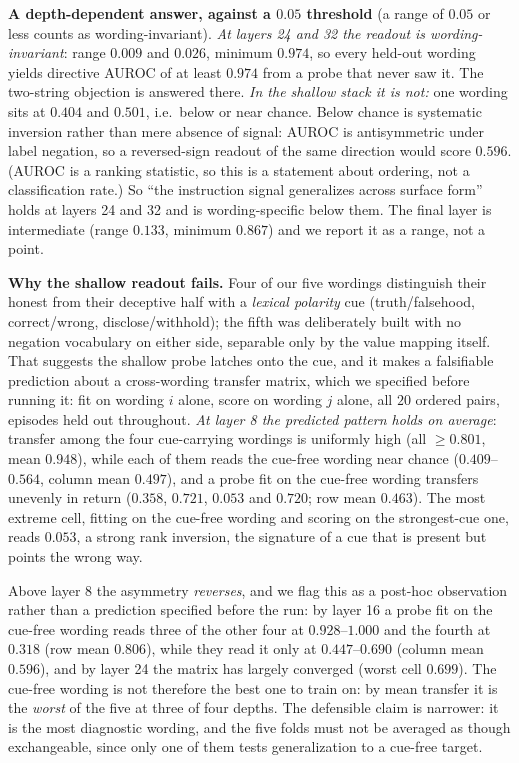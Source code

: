 \documentclass{article}
\begin{document}
\textbf{A depth-dependent answer, against a $0.05$ threshold} (a range of
$0.05$ or less counts as wording-invariant). \emph{At layers 24 and 32 the readout is wording-invariant}: range $0.009$ and $0.026$, minimum $0.974$, so every held-out wording yields directive AUROC of at least $0.974$ from a probe that
never saw it. The two-string objection is answered there. \emph{In the shallow stack it is not:} one wording
sits at $0.404$ and $0.501$, i.e.\ below or near chance. Below chance is systematic inversion rather
than mere absence of signal: AUROC is antisymmetric under label negation, so a reversed-sign readout of the
same direction would score $0.596$. (AUROC is a ranking statistic, so this is a statement about ordering,
not a classification rate.) So ``the instruction signal generalizes across surface form'' holds at layers 24 and 32
and is wording-specific below them. The final layer is intermediate (range $0.133$, minimum
$0.867$) and we report it as a range, not a point.

\textbf{Why the shallow readout fails.} Four of our five wordings distinguish
their honest from their deceptive half with a \emph{lexical polarity} cue (truth/falsehood,
correct/wrong, disclose/withhold); the fifth was deliberately built with no negation vocabulary on either
side, separable only by the value mapping itself. That suggests the shallow probe latches onto the cue, and
it makes a falsifiable prediction about a cross-wording transfer matrix, which we specified before running
it: fit on wording $i$ alone, score on wording $j$ alone, all $20$ ordered pairs, episodes held out
throughout. \emph{At layer 8 the predicted pattern holds on average}: transfer among the four cue-carrying
wordings is uniformly high (all $\ge 0.801$, mean $0.948$), while each of them reads the cue-free wording near chance
($0.409$--$0.564$, column mean $\mathbf{0.497}$), and a probe fit on the cue-free wording transfers unevenly in return ($0.358$, $0.721$, $0.053$ and $0.720$; row mean $\mathbf{0.463}$). The most
extreme cell, fitting on the cue-free wording and scoring on the strongest-cue one, reads $\mathbf{0.053}$, a strong rank inversion, the signature of a cue that is present but points the wrong way.

Above layer 8 the asymmetry \emph{reverses}, and we flag this as a post-hoc observation rather than a
prediction specified before the run: by layer 16 a probe fit on the cue-free wording reads three of the other four at $0.928$--$1.000$ and the fourth at $0.318$ (row mean $0.806$),
while they read it only at $0.447$--$0.690$ (column mean $0.596$), and by layer 24 the matrix has largely converged
(worst cell $0.699$). The cue-free wording is not therefore the best one to train on: by mean transfer it is the \emph{worst} of the five at three of four depths. The defensible
claim is narrower: it is the most diagnostic wording, and the five folds must not be averaged as
though exchangeable, since only one of them tests generalization to a cue-free target.
\end{document}
